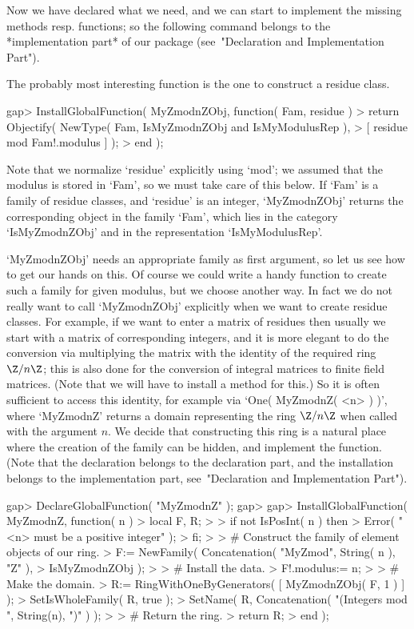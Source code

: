 Now we have declared what we need,
and we can start to implement the missing methods resp. functions;
so the following command belongs to the *implementation part* of our
package (see~"Declaration and Implementation Part").

The probably most interesting function is the one to construct a
residue class.

\beginexample
gap> InstallGlobalFunction( MyZmodnZObj, function( Fam, residue )
>    return Objectify( NewType( Fam, IsMyZmodnZObj and IsMyModulusRep ),
>                      [ residue mod Fam!.modulus ] );
> end );
\endexample

Note that we normalize `residue' explicitly using `mod';
we assumed that the modulus is stored in `Fam',
so we must take care of this below.
If `Fam' is a family of residue classes, and `residue' is an integer,
`MyZmodnZObj' returns the corresponding object in the family `Fam',
which lies in the category `IsMyZmodnZObj' and in the representation
`IsMyModulusRep'.

`MyZmodnZObj' needs an appropriate family as first argument,
so let us see how to get our hands on this.
Of course we could write a handy function to create such a family
for given modulus, but we choose another way.
In fact we do not really want to call `MyZmodnZObj' explicitly when we
want to create residue classes.
For example, if we want to enter a matrix of residues then usually
we start with a matrix of corresponding integers,
and it is more elegant to do the conversion via multiplying the matrix
with the identity of the required ring $\Z/n\Z$;
this is also done for the conversion of integral matrices to
finite field matrices.
(Note that we will have to install a method for this.)
So it is often sufficient to access this identity,
for example via `One( MyZmodnZ( <n> ) )',
where `MyZmodnZ' returns a domain representing the ring $\Z/n\Z$
when called with the argument $n$.
We decide that constructing this ring is a natural place where the
creation of the family can be hidden,
and implement the function.
(Note that the declaration belongs to the declaration part,
and the installation belongs to the implementation part,
see~"Declaration and Implementation Part").

\beginexample
gap> DeclareGlobalFunction( "MyZmodnZ" );
gap> 
gap> InstallGlobalFunction( MyZmodnZ, function( n )
>    local F, R;
> 
>    if not IsPosInt( n ) then
>      Error( "<n> must be a positive integer" );
>    fi;
> 
>    # Construct the family of element objects of our ring.
>    F:= NewFamily( Concatenation( "MyZmod", String( n ), "Z" ),
>                   IsMyZmodnZObj );
> 
>    # Install the data.
>    F!.modulus:= n;
> 
>    # Make the domain.
>    R:= RingWithOneByGenerators( [ MyZmodnZObj( F, 1 ) ] );
>    SetIsWholeFamily( R, true );
>    SetName( R, Concatenation( "(Integers mod ", String(n), ")" ) );
> 
>    # Return the ring.
>    return R;
> end );
\endexample

